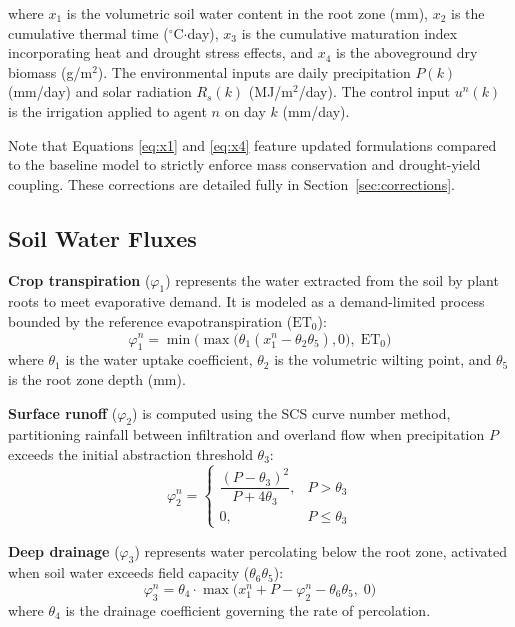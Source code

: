where $x_1$ is the volumetric soil water content in the root zone (mm), $x_2$ is the cumulative thermal time ($^{\circ}$C$\cdot$day), $x_3$ is the cumulative maturation index incorporating heat and drought stress effects, and $x_4$ is the aboveground dry biomass (g/m$^2$). The environmental inputs are daily precipitation $P(k)$ (mm/day) and solar radiation $R_s(k)$ (MJ/m$^2$/day). The control input $u^n(k)$ is the irrigation applied to agent $n$ on day $k$ (mm/day).

Note that Equations \ref{eq:x1} and \ref{eq:x4} feature updated formulations compared to the baseline model to strictly enforce mass conservation and drought-yield coupling. These corrections are detailed fully in Section~\ref{sec:corrections}.

\subsection{Soil Water Fluxes}
\label{sec:soil_fluxes}

\textbf{Crop transpiration} ($\varphi_1$) represents the water extracted from the soil by plant roots to meet evaporative demand. It is modeled as a demand-limited process bounded by the reference evapotranspiration ($\text{ET}_0$):
\begin{equation}
    \varphi_1^n = \min\!\Big(\max\!\big(\theta_1(x_1^n - \theta_2 \theta_5), 0\big),\; \text{ET}_0\Big)
    \label{eq:phi1}
\end{equation}
where $\theta_1$ is the water uptake coefficient, $\theta_2$ is the volumetric wilting point, and $\theta_5$ is the root zone depth (mm). 

\textbf{Surface runoff} ($\varphi_2$) is computed using the SCS curve number method, partitioning rainfall between infiltration and overland flow when precipitation $P$ exceeds the initial abstraction threshold $\theta_3$:
\begin{equation}
    \varphi_2^n = 
    \begin{cases}
        \dfrac{(P - \theta_3)^2}{P + 4\theta_3}, & P > \theta_3 \\[8pt]
        0, & P \leq \theta_3
    \end{cases}
    \label{eq:phi2}
\end{equation}

\textbf{Deep drainage} ($\varphi_3$) represents water percolating below the root zone, activated when soil water exceeds field capacity ($\theta_6 \theta_5$):
\begin{equation}
    \varphi_3^n = \theta_4 \cdot \max\!\big(x_1^n + P - \varphi_2^n - \theta_6 \theta_5,\; 0\big)
    \label{eq:phi3}
\end{equation}
where $\theta_4$ is the drainage coefficient governing the rate of percolation.


